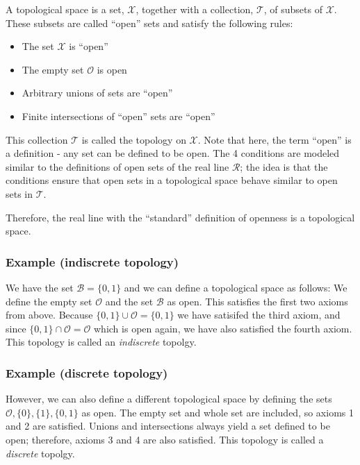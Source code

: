 
A topological space is a set, \(\mathcal{X}\), together with a
collection, \(\mathcal{T}\), of subsets of \(\mathcal{X}\). These
subsets are called ``open'' sets and satisfy the following rules:

\begin{itemize}
\item
  The set \(\mathcal{X}\) is ``open''
\item
  The empty set \(\mathcal{O}\) is open
\item
  Arbitrary unions of sets are ``open''
\item
  Finite intersections of ``open'' sets are ``open''
\end{itemize}

This collection \(\mathcal{T}\) is called the topology on
\(\mathcal{X}\). Note that here, the term ``open'' is a definition - any
set can be defined to be open. The 4 conditions are modeled similar to
the definitions of open sets of the real line \(\mathcal{R}\); the idea
is that the conditions ensure that open sets in a topological space
behave similar to open sets in \(\mathcal{T}\).

Therefore, the real line with the ``standard'' definition of openness is
a topological space.

\subsubsection{Example (indiscrete topology)}

We have the set \(\mathcal{B} = \{0,1\}\) and we can define a
topological space as follows: We define the empty set \(\mathcal{O}\)
and the set \(\mathcal{B}\) as open. This satisfies the first two axioms
from above. Because \(\{0,1\} \cup \mathcal{O} = \{0,1\}\) we have
satisifed the third axiom, and since
\(\{0,1\} \cap \mathcal{O} = \mathcal{O}\) which is open again, we have
also satisfied the fourth axiom. This topology is called an
\emph{indiscrete} topolgy.

\subsubsection{Example (discrete topology)}

However, we can also define a different topological space by defining
the sets \(\mathcal{O}, \{0\}, \{1\}, \{0,1\}\) as open. The empty set
and whole set are included, so axioms 1 and 2 are satisfied. Unions and
intersections always yield a set defined to be open; therefore, axioms 3
and 4 are also satisfied. This topology is called a \emph{discrete}
topolgy.

